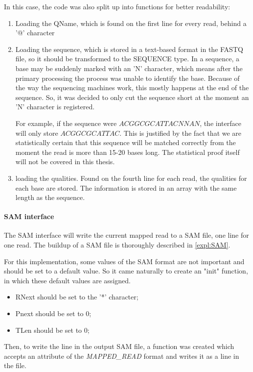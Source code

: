 In this case, the code was also split up into functions for better readability:
\begin{enumerate}
	\item Loading the QName, which is found on the first line for every read, behind a '@' character
	\item Loading the sequence, which is stored in a text-based format in the FASTQ file, so it should be transformed to the SEQUENCE type. In a sequence, a base may be suddenly marked with an 'N' character, which means after the primary processing the process was unable to identify the base. Because of the way the sequencing machines work, this mostly happens at the end of the sequence. So, it was decided to only cut the sequence short at the moment an 'N' character is registered.
	
	For example, if the sequence were $ACGGCGCATTACNNAN$, the interface will only store $ACGGCGCATTAC$. This is justified by the fact that we are statistically certain that this sequence will be matched correctly from the moment the read is more than 15-20 bases long. The statistical proof itself will not be covered in this thesis.
	\item loading the qualities. Found on the fourth line for each read, the qualities for each base are stored. The information is stored in an array with the same length as the sequence.
\end{enumerate}


\paragraph{SAM interface} The SAM interface will write the current mapped read to a SAM file, one line for one read. The buildup of a SAM file is thoroughly described in \ref{expl:SAM}.

For this implementation, some values of the SAM format are not important and should be set to a default value. So it came naturally to create an "init" function, in which these default values are assigned. 
\begin{itemize}
	\item RNext should be set to the '*' character;
	\item Pnext should be set to 0;
	\item TLen should be set to 0;
\end{itemize}

Then, to write the line in the output SAM file, a function was created which accepts an attribute of the \emph{MAPPED\_READ} format and writes it as a line in the file.


